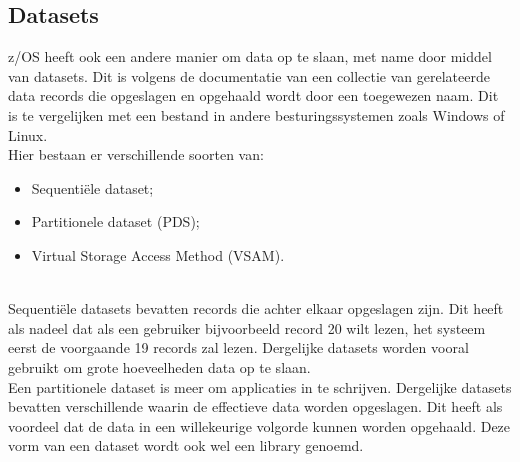 \subsection{Datasets}
z/OS heeft ook een andere manier om data op te slaan, met name door middel van datasets. Dit is volgens de documentatie van \textcite{IBM} een collectie van gerelateerde data records die opgeslagen en opgehaald wordt door een toegewezen naam. Dit is te vergelijken met een bestand in andere besturingssystemen zoals Windows of Linux. \\

Hier bestaan er verschillende soorten van:

\begin{itemize}
    \item Sequentiële dataset;
    \item Partitionele dataset (PDS);
    \item Virtual Storage Access Method (VSAM).
\end{itemize} \\

Sequentiële datasets bevatten records die achter elkaar opgeslagen zijn. Dit heeft als nadeel dat als een gebruiker bijvoorbeeld record 20 wilt lezen, het systeem eerst de voorgaande 19 records zal lezen. Dergelijke datasets worden vooral gebruikt om grote hoeveelheden data op te slaan. \autocite{IBM} \\

Een partitionele dataset is meer om applicaties in te schrijven. Dergelijke datasets bevatten verschillende  waarin de effectieve data worden opgeslagen. Dit heeft als voordeel dat de data in een willekeurige volgorde kunnen worden opgehaald. Deze vorm van een dataset wordt ook wel een library genoemd. \autocite{IBM} \\

